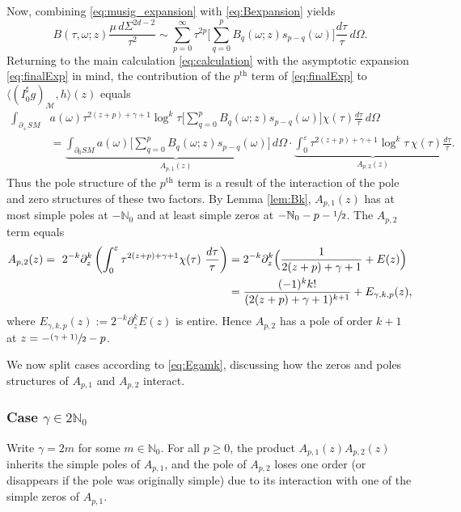 \documentclass[11pt]{article}
\let\cal\mathcal
\newcommand{\psfrac}[2]{\sfrac{(#1)}{#2}}
\theoremstyle{plain}
\theoremstyle{definition}
\theoremstyle{remark}
\def\Nm{{\mathbb{N}}}
\newcommand{\adj}{I_0^\sharp}
\begin{document}
Now, combining \eqref{eq:musig_expansion} with \eqref{eq:Bexpansion} yields
\begin{equation}
B(\tau,\omega; z) \frac{\mu \, d\Sigma^{2d-2}}{\tau^2} \sim \sum_{p=0}^\infty \tau^{2p}
\biggl[\sum_{q=0}^{p} B_q(\omega; z) s_{p-q}(\omega) \biggr] \frac{d\tau}{\tau}\,d\Omega.
\label{eq:finalExp}
\end{equation}
Returning to the main calculation \eqref{eq:calculation} with the asymptotic expansion \eqref{eq:finalExp} in mind, the contribution of the $p^{\mathrm{th}}$ term of \eqref{eq:finalExp} to $\langle (\adj g)_{\cal M}, h\rangle(z)$ equals
\begin{align*}
\int_{\partial_+ SM} & a(\omega) \tau^{2(z+p)+\gamma+1} \log^k\tau \biggl[\sum_{q=0}^{p} B_q(\omega; z) s_{p-q}(\omega) \biggr]
\chi(\tau) \frac{d\tau}{\tau}\,d\Omega \\
&= \underbrace{\int_{\partial_0 SM} a(\omega) \biggl[\sum_{q=0}^{p} B_q(\omega; z) s_{p-q}(\omega) \biggr]\,d\Omega}_{A_{p,1}(z)} \cdot \underbrace{\int_0^\varepsilon \tau^{2(z+p)+\gamma+1} \log^k \tau \, \chi(\tau) \frac{d\tau}{\tau}}_{A_{p,2}(z)}.
\end{align*}
Thus the pole structure of the $p^{\mathrm{th}}$ term is a result of the interaction of the pole and zero structures of these two factors.
By Lemma \ref{lem:Bk}, $A_{p,1}(z)$ has at most simple poles at $-\Nm_0$ and at least simple zeros at $-\Nm_0 - p - \sfrac{1}{2}$. The $A_{p,2}$ term equals
\begin{align*}
A_{p,2}(z) = \ 2^{-k} \partial_z^k \left(\int_0^\varepsilon \tau^{2(z+p)+\gamma+1} \chi(\tau)\ \frac{d\tau}{\tau} \right) &= 2^{-k} \partial_z^k \Bigl(\frac{1}{2(z+p)+\gamma+1} + E(z) \Bigr) \\
&= \frac{(-1)^k k!}{(2(z+p) + \gamma+1)^{k+1}} + E_{\gamma,k,p}(z),
\end{align*}
where $E_{\gamma,k,p}(z) := 2^{-k} \partial_z^k E(z)$ is entire. Hence $A_{p,2}$ has a pole of order $k+1$ at $z = -\psfrac{\gamma+1}{2}-p$.

We now split cases according to \eqref{eq:Egamk}, discussing how the zeros and poles structures of $A_{p,1}$ and $A_{p,2}$ interact.

\subsubsection*{Case $\gamma\in 2\Nm_0$}
Write $\gamma = 2m$ for some $m\in \Nm_0$. For all $p\ge 0$, the product $A_{p,1}(z) A_{p,2}(z)$ inherits the simple poles of $A_{p,1}$, and the pole of $A_{p,2}$ loses one order (or disappears if the pole was originally simple) due to its interaction with one of the simple zeros of $A_{p,1}$.
\end{document}
